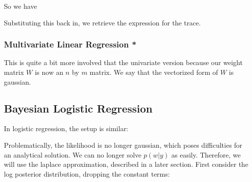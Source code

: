 \documentclass[12pt]{article}
\begin{document}
So we have


Substituting this back in, we retrieve the expression for the trace.


\subsubsection{Multivariate Linear Regression *}

This is quite a bit more involved that the univariate version because our weight matrix $W$ is now an $n$ by $m$ matrix. We say that the vectorized form of $W$ is gaussian.

\subsection{Bayesian Logistic Regression}

In logistic regression, the setup is similar:

Problematically, the likelihood is no longer gaussian, which poses difficulties for an analytical solution. We can no longer solve $p(w|y)$ as easily. Therefore, we will use the laplace approximation, described in a later section. First consider the log posterior distribution, dropping the constant terms:
\end{document}

